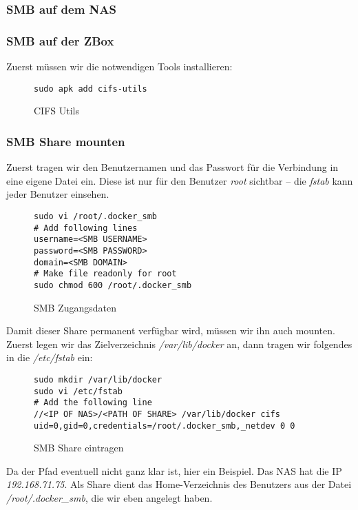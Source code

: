 \documentclass[12pt,a4paper,ngerman]{article}
\newcommand{\code}[1]{\textit{#1}}
\newcommand{\jpacaption}[1]{\caption{#1}\label{fig:#1}}
\begin{document}
\subsubsection{SMB auf dem NAS}

\subsubsection{SMB auf der ZBox}
Zuerst müssen wir die notwendigen Tools installieren:

\begin{figure}[H]
    \begin{lstlisting}
sudo apk add cifs-utils
    \end{lstlisting}
    \jpacaption{CIFS Utils}
\end{figure}

\subsubsection{SMB Share mounten}
Zuerst tragen wir den Benutzernamen und das Passwort für die Verbindung in eine
eigene Datei ein. Diese ist nur für den Benutzer \code{root} sichtbar -- die
\code{fstab} kann jeder Benutzer einsehen.

\begin{figure}[H]
    \begin{lstlisting}
sudo vi /root/.docker_smb
# Add following lines
username=<SMB USERNAME>
password=<SMB PASSWORD>
domain=<SMB DOMAIN>
# Make file readonly for root
sudo chmod 600 /root/.docker_smb
    \end{lstlisting}
    \jpacaption{SMB Zugangsdaten}
\end{figure}

Damit dieser Share permanent verfügbar wird, müssen wir ihn auch mounten. Zuerst
legen wir das Zielverzeichnis \code{/var/lib/docker} an, dann tragen wir
folgendes in die \code{/etc/fstab} ein:

\begin{figure}[H]
    \begin{lstlisting}
sudo mkdir /var/lib/docker
sudo vi /etc/fstab
# Add the following line
//<IP OF NAS>/<PATH OF SHARE> /var/lib/docker cifs uid=0,gid=0,credentials=/root/.docker_smb,_netdev 0 0
    \end{lstlisting}
    \jpacaption{SMB Share eintragen}
\end{figure}

Da der Pfad eventuell nicht ganz klar ist, hier ein Beispiel. Das NAS hat die
IP \code{192.168.71.75}. Als Share dient das Home-Verzeichnis des Benutzers
aus der Datei \code{/root/.docker\_smb}, die wir eben angelegt haben.
\end{document}
